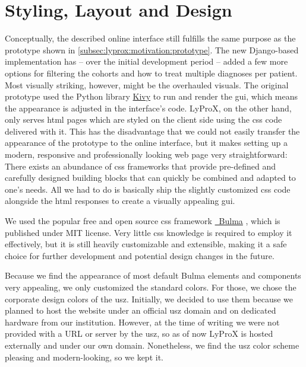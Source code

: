 \documentclass[\relativeRoot/main.tex]{subfiles}
\begin{document}
\section{Styling, Layout and Design}
\label{sec:lyprox:design}

Conceptually, the described online interface still fulfills the same purpose as the prototype shown in \cref{subsec:lyprox:motivation:prototype}. The new Django-based implementation has -- over the initial development period -- added a few more options for filtering the cohorts and how to treat multiple diagnoses per patient. Most visually striking, however, might be the overhauled visuals. The original prototype used the Python library \href{https://kivy.org}{Kivy} to run and render the \gls{gui}, which means the appearance is adjusted in the interface's code. LyProX, on the other hand, only serves \acrshort{html} pages which are styled on the client side using the \gls{css} code delivered with it. This has the disadvantage that we could not easily transfer the appearance of the prototype to the online interface, but it makes setting up a modern, responsive and professionally looking web page very straightforward: There exists an abundance of \gls{css} frameworks that provide pre-defined and carefully designed building blocks that can quickly be combined and adapted to one's needs. All we had to do is basically ship the slightly customized \gls{css} code alongside the \acrshort{html} responses to create a visually appealing \gls{gui}.

We used the popular free and open source \gls{css} framework \href{https://bulma.io}{~Bulma} \cite{thomas_bulma_2021}, which is published under MIT license. Very little \gls{css} knowledge is required to employ it effectively, but it is still heavily customizable and extensible, making it a safe choice for further development and potential design changes in the future.

Because we find the appearance of most default Bulma elements and components very appealing, we only customized the standard colors. For those, we chose the corporate design colors of the \gls{usz}. Initially, we decided to use them because we planned to host the website under an official \gls{usz} domain and on dedicated hardware from our institution. However, at the time of writing we were not provided with a URL or server by the \gls{usz}, so as of now LyProX is hosted externally and under our own domain. Nonetheless, we find the \gls{usz} color scheme pleasing and modern-looking, so we kept it.
\end{document}
